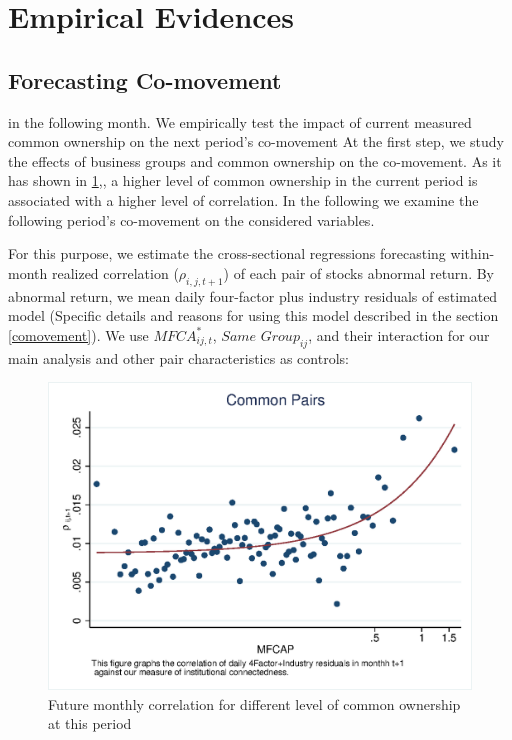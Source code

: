 
\section{Empirical Evidences}



\subsection{{Forecasting Co-movement}}
\label{Forecasting Co-movement}

	in the following month. We empirically test the impact of current measured
	common ownership on the next period’s co-movement
	At the first step, we study the effects of business groups and common ownership on the co-movement. As it has shown in \ref{mcorr50},, a higher level of common	ownership in the current period is associated with a higher level of correlation. In the following we examine the following period's co-movement on the considered variables.
	
	
	For this purpose, we estimate the cross-sectional regressions forecasting within-month realized correlation ($\rho_{i,j,t+1}$) of each pair of stocks abnormal return. By abnormal return, we mean daily four-factor plus industry residuals of estimated model (Specific details and reasons for using this model described in the section \ref{comovement}). We use $\textit{MFCA}^*_{ij,t}$, $\textit{Same Group}_{ij} $, and their interaction for our main analysis and other pair characteristics as controls:
	
	\begin{figure}[htbp]
		\centering  
		\centering
		\includegraphics[width=0.7\linewidth]{"Output/mcorr50.eps"} 
		\caption{Future monthly correlation for different level of common ownership at this period }
		\label{mcorr50}
	\end{figure}
	
